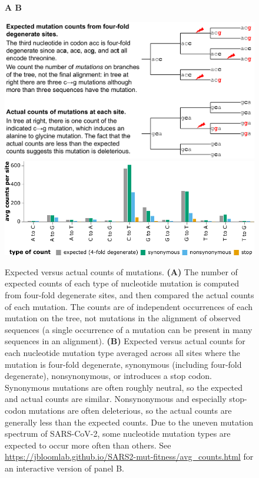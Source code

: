 \documentclass[9pt,twocolumn,twoside]{gsajnl_modified}
\begin{document}
\begin{figure}
{\bf \Large A \hspace{0.47\linewidth} B}

\includegraphics[width=0.48\linewidth,valign=t]{figs/schematic/schematic.pdf}
\hspace{0.02\linewidth}
\includegraphics[width=0.5\linewidth,valign=t]{figs/avg_counts.pdf}
\caption{
Expected versus actual counts of mutations.
{\bf (A)}
The number of expected counts of each type of nucleotide mutation is computed from four-fold degenerate sites, and then compared the actual counts of each mutation.
The counts are of independent occurrences of each mutation on the tree, not mutations in the alignment of observed sequences (a single occurrence of a mutation can be present in many sequences in an alignment).
{\bf (B)}
Expected versus actual counts for each nucleotide mutation type averaged across all sites where the mutation is four-fold degenerate, synonymous (including four-fold degenerate), nonsynonymous, or introduces a stop codon.
Synonymous mutations are often roughly neutral, so the expected and actual counts are similar.
Nonsynonymous and especially stop-codon mutations are often deleterious, so the actual counts are generally less than the expected counts.
Due to the uneven mutation spectrum of SARS-CoV-2, some nucleotide mutation types are expected to occur more often than others.
See \url{https://jbloomlab.github.io/SARS2-mut-fitness/avg_counts.html} for an interactive version of panel B.
\label{fig:expected_vs_actual}
}
\end{figure}
\end{document}
